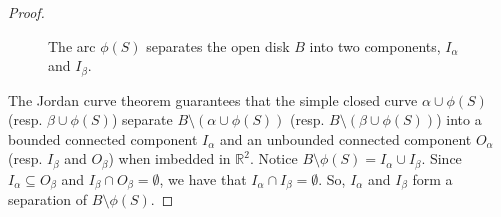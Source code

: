 \begin{proof}
\begin{figure}[h!]
    \centering
    \caption{The arc \(\phi(S)\) separates the open disk \(B\) into two components, \(I_{\alpha}\) and \(I_{\beta}\).}
    \label{fig:thm:book_1_1}
\end{figure}

The Jordan curve theorem guarantees that the simple closed curve \(\alpha \cup \phi(S)\) (resp. \(\beta \cup \phi(S)\))
separate \(B \setminus (\alpha \cup \phi(S))\) (resp. \(B \setminus (\beta \cup \phi(S))\)) into a bounded connected component
\(I_{\alpha}\) and an unbounded connected component \(O_{\alpha}\) (resp. \(I_{\beta}\) and \(O_{\beta}\)) when imbedded in \(\mathbb{R}^2\).
Notice \(B\setminus \phi(S) = I_{\alpha} \cup I_{\beta}\).
Since \(I_{\alpha} \subseteq O_{\beta}\) and \(I_{\beta} \cap O_{\beta} = \emptyset\),
we have that \(I_{\alpha} \cap I_{\beta} = \emptyset\).
So, \(I_{\alpha}\) and \(I_{\beta}\) form a separation of \(B\setminus \phi(S)\).
\end{proof}

